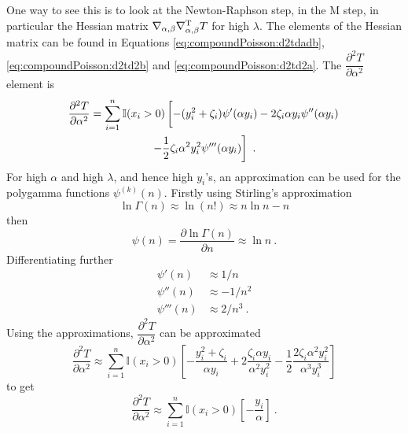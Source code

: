 \documentclass[12pt, a4paper]{memoir}
\newcommand{\T}{^\textup{T}}
\begin{document}
One way to see this is to look at the Newton-Raphson step, in the M step, in particular the Hessian matrix $\nabla_{\alpha,\beta}\nabla_{\alpha,\beta}\T T$ for high $\lambda$. The elements of the Hessian matrix can be found in Equations \eqref{eq:compoundPoisson:d2tdadb}, \eqref{eq:compoundPoisson:d2td2b} and \eqref{eq:compoundPoisson:d2td2a}. The $\dfrac{\partial^2T}{\partial\alpha^2}$ element is 
\begin{multline*}
	\frac{\partial^2 T}{\partial \alpha^2} = 
	\sum_{i=1}^n\mathbb{I}(x_i>0)\left[
		-(y_i^2+\zeta_i)\psi'(\alpha y_i) - 2\zeta_i\alpha y_i\psi''(\alpha y_i)
		\vphantom{\frac{1}{2}}
	\right.
	\\
	\left.	
		-\frac{1}{2}\zeta_i\alpha^2y_i^2\psi'''(\alpha y_i)
	\right]
	\ .
\end{multline*}
For high $\alpha$ and high $\lambda$, and hence high $y_i$'s, an approximation can be used for the polygamma functions $\psi^{(k)}(n)$. Firstly using Stirling's approximation
\begin{equation}
	\ln\Gamma(n)\approx\ln(n!)\approx n\ln n-n
\end{equation}
then
\begin{equation}
	\psi(n) = \frac{\partial\ln\Gamma(n)}{\partial n} \approx \ln n
	\ .
\end{equation}
Differentiating further
\begin{align}
	\psi'(n) &\approx 1/n \\
	\psi''(n) & \approx -1/n^2 \\
	\psi'''(n) & \approx 2/n^3
	\ .
\end{align}
Using the approximations, $\dfrac{\partial^2T}{\partial\alpha^2}$ can be approximated
\begin{equation*}
	\frac{\partial^2 T}{\partial \alpha^2} \approx 
	\sum_{i=1}^n\mathbb{I}(x_i>0)
	\left[
		-\frac{y_i^2+\zeta_i}{\alpha y_i} + 2\frac{\zeta_i\alpha y_i}{\alpha^2 y_i^2}
		-\frac{1}{2}\frac{2\zeta_i\alpha^2y_i^2}{\alpha^3 y_i^3}
	\right]
\end{equation*}
to get
\begin{equation}
	\frac{\partial^2 T}{\partial \alpha^2} \approx 
	\sum_{i=1}^n\mathbb{I}(x_i>0)
	\left[
		-\frac{y_i}{\alpha}
	\right]
	\ .
\end{equation}
\end{document}
